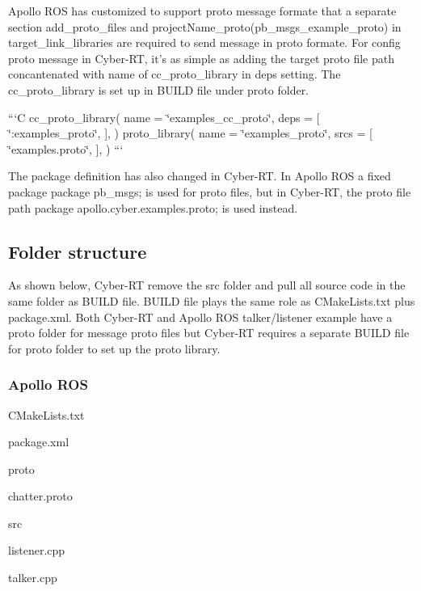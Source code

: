 Apollo R\-O\-S has customized to support proto message formate that a separate section {\ttfamily add\-\_\-proto\-\_\-files} and project\-Name\-\_\-proto({\ttfamily pb\-\_\-msgs\-\_\-example\-\_\-proto}) in {\ttfamily target\-\_\-link\-\_\-libraries} are required to send message in proto formate. For config proto message in Cyber-\/\-R\-T, it's as simple as adding the target proto file path concantenated with name of {\ttfamily cc\-\_\-proto\-\_\-library} in {\ttfamily deps} setting. The {\ttfamily cc\-\_\-proto\-\_\-library} is set up in B\-U\-I\-L\-D file under proto folder.

```\-C cc\-\_\-proto\-\_\-library( name = \char`\"{}examples\-\_\-cc\-\_\-proto\char`\"{}, deps = \mbox{[} \char`\"{}\-:examples\-\_\-proto\char`\"{}, \mbox{]}, ) proto\-\_\-library( name = \char`\"{}examples\-\_\-proto\char`\"{}, srcs = \mbox{[} \char`\"{}examples.\-proto\char`\"{}, \mbox{]}, ) ```

The package definition has also changed in Cyber-\/\-R\-T. In Apollo R\-O\-S a fixed package {\ttfamily package pb\-\_\-msgs;} is used for proto files, but in Cyber-\/\-R\-T, the proto file path {\ttfamily package apollo.\-cyber.\-examples.\-proto;} is used instead.

\subsection*{Folder structure}

As shown below, Cyber-\/\-R\-T remove the src folder and pull all source code in the same folder as B\-U\-I\-L\-D file. B\-U\-I\-L\-D file plays the same role as C\-Make\-Lists.\-txt plus package.\-xml. Both Cyber-\/\-R\-T and Apollo R\-O\-S talker/listener example have a proto folder for message proto files but Cyber-\/\-R\-T requires a separate B\-U\-I\-L\-D file for proto folder to set up the proto library.

\subsubsection*{Apollo R\-O\-S}


\begin{DoxyItemize}
\item C\-Make\-Lists.\-txt
\item package.\-xml
\item proto
\begin{DoxyItemize}
\item chatter.\-proto
\end{DoxyItemize}
\item src
\begin{DoxyItemize}
\item listener.\-cpp
\item talker.\-cpp
\end{DoxyItemize}
\end{DoxyItemize}

